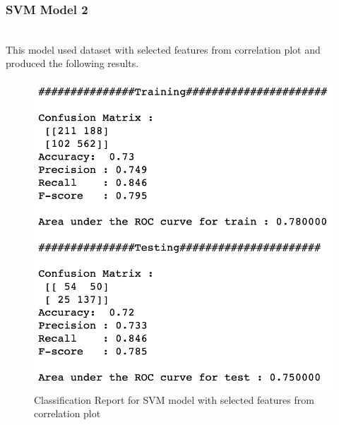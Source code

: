 \documentclass[format=sigconf]{acmart}
\begin{document}
\subsubsection{SVM Model 2}
\hfill\\
This model used dataset with selected features from correlation plot and produced the following results.

\begin{figure}[H]
    \centering
    \includegraphics[scale=0.50]{SVM_Model_2_results.png}
    \caption{Classification Report for SVM model with selected features from correlation plot}
    \label{fig:svmmodel2}
\end{figure}
\end{document}
